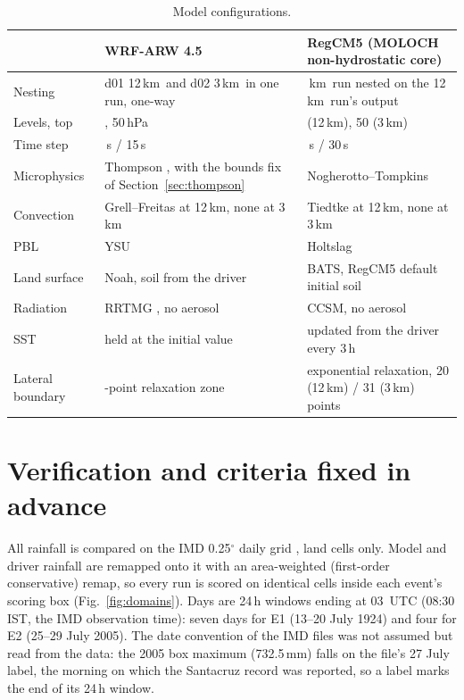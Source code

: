\documentclass[11pt,a4paper]{article}
\newcommand{\km}{\,km}
\newcommand{\mm}{\,mm}
\begin{document}
\begin{table}[htbp]
\centering\small
\caption{Model configurations.}
\label{tab:models}
\begin{tabularx}{\textwidth}{@{}l>{\raggedright\arraybackslash}X>{\raggedright\arraybackslash}X@{}}
\toprule
 & WRF-ARW 4.5 & RegCM5 (MOLOCH non-hydrostatic core) \\
\midrule
Nesting & d01 12\km\ and d02 3\km\ in one run, one-way & 3\km\ run nested on the 12\km\ run's output \\
Levels, top & 50, 50\,hPa & 30 (12\km), 50 (3\km) \\
Time step & 60\,s / 15\,s & 90\,s / 30\,s \\
Microphysics & Thompson \citep{thompson2008}, with the bounds fix of Section~\ref{sec:thompson} & Nogherotto--Tompkins \citep{nogherotto2016} \\
Convection & Grell--Freitas \citep{grell2014} at 12\km, none at 3\km & Tiedtke \citep{tiedtke1989} at 12\km, none at 3\km \\
PBL & YSU \citep{hong2006} & Holtslag \\
Land surface & Noah, soil from the driver & BATS, RegCM5 default initial soil \\
Radiation & RRTMG \citep{iacono2008}, no aerosol & CCSM, no aerosol \\
SST & held at the initial value & updated from the driver every 3\,h \\
Lateral boundary & 5-point relaxation zone & exponential relaxation, 20 (12\km) / 31 (3\km) points \\
\bottomrule
\end{tabularx}
\end{table}

\section{Verification and criteria fixed in advance}
\label{sec:verification}

All rainfall is compared on the IMD 0.25$^\circ$ daily grid \citep{pai2014}, land cells only.
Model and driver rainfall are remapped onto it with an area-weighted (first-order
conservative) remap, so every run is scored on identical cells inside each event's scoring
box (Fig.~\ref{fig:domains}). Days are 24\,h windows ending at 03~UTC (08:30 IST, the IMD
observation time): seven days for E1 (13--20 July 1924) and four for E2 (25--29 July 2005).
The date convention of the IMD files was not assumed but read from the data: the 2005 box
maximum (732.5\mm) falls on the file's 27 July label, the morning on which the Santacruz
record was reported, so a label marks the end of its 24\,h window.
\end{document}
